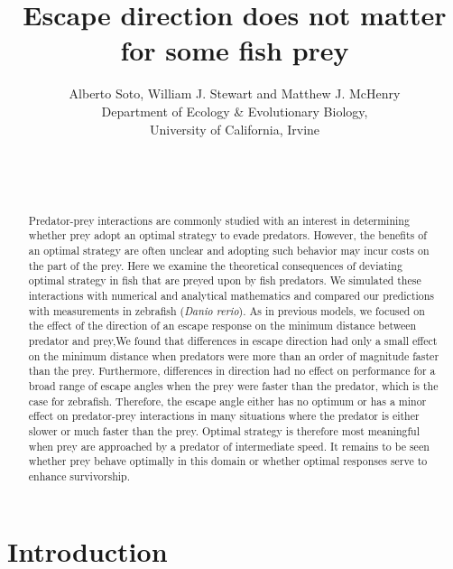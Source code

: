 \documentclass[12pt]{article}
\title{Escape direction does not matter for some fish prey}
\author{Alberto Soto, William J. Stewart and Matthew J. McHenry\\
  Department of Ecology \& Evolutionary Biology,\\
  University of California, Irvine\\ \\ \\ \\}
\begin{document}

\maketitle

\pagebreak


\begin{abstract}

Predator-prey interactions are commonly studied with an interest in determining whether prey adopt an optimal strategy to evade predators. However, the benefits of an optimal strategy are often unclear and adopting such behavior may incur costs on the part of the prey.  Here we examine the theoretical consequences of deviating optimal strategy in fish that are preyed upon by fish predators. We simulated these interactions with numerical and analytical mathematics and compared our predictions with measurements in zebrafish (\textit{Danio rerio}). As in previous models, we focused on the effect of the direction of an escape response on the minimum distance between predator and prey,We found that differences in escape direction had only a small effect on the minimum distance when predators were more than an order of magnitude faster than the prey. Furthermore, differences in direction had no effect on performance for a broad range of escape angles when the prey were faster than the predator, which is the case for zebrafish. Therefore, the escape angle either has no optimum or has a minor effect on predator-prey interactions in many situations where the predator is either slower or much faster than the prey. Optimal strategy is therefore most meaningful when prey are approached by a predator of intermediate speed. It remains to be seen whether prey behave optimally in this domain or whether optimal responses serve to enhance survivorship.

\end{abstract}

\pagebreak


\section{Introduction}
\label{intro}
\end{document}
